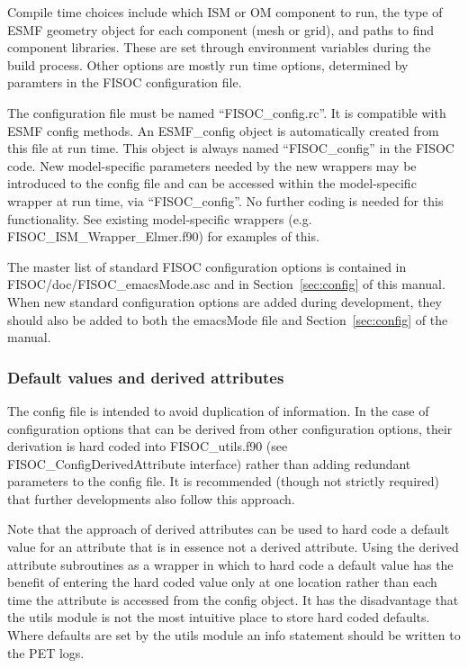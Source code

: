 \documentclass[11pt]{article}
\begin{document}
Compile time choices include which ISM or OM component to run, the type of ESMF
geometry object for each component (mesh or grid), and paths to find
component libraries.
These are set through environment variables during the build process.
Other options are mostly run time options, determined by paramters in the FISOC
configuration file. 

The configuration file must be named ``FISOC\_config.rc''.  
It is compatible with ESMF config methods.  
An ESMF\_config object is automatically created from this file at run time.
This object is always named ``FISOC\_config'' in the FISOC code.
New model-specific parameters needed by the new wrappers may be 
introduced to the config file and can be accessed 
within the model-specific wrapper at run time, via  ``FISOC\_config''. 
No further coding is needed for this functionality.
See existing model-specific wrappers (e.g. FISOC\_ISM\_Wrapper\_Elmer.f90) 
for examples of this.

The master list of standard FISOC configuration options is contained in 
FISOC/doc/FISOC\_emacsMode.asc and in Section~\ref{sec:config} of this 
manual. 
When new standard configuration options are added during development, they 
should also be added to both the emacsMode file and  
Section~\ref{sec:config} of the manual.


\subsubsection{Default values and derived attributes}

The config file is intended to avoid duplication of information.  
In the case of configuration options that can be derived from other 
configuration options, their derivation is hard coded into 
FISOC\_utils.f90 (see FISOC\_ConfigDerivedAttribute interface) 
rather than adding redundant parameters to the config file.
It is recommended (though not strictly required) that further developments 
also follow this approach. 

Note that the approach of derived attributes can be used to hard code a 
default value for an attribute that is in essence not a derived attribute. 
Using the derived attribute subroutines as a wrapper in which to hard 
code a default value has the benefit of entering the hard coded value 
only at one location rather than each time the attribute is accessed 
from the config object.
It has the disadvantage that the utils module is not the most intuitive
place to store hard coded defaults.
Where defaults are set by the utils module an info statement should be written
to the PET logs. 
\end{document}
